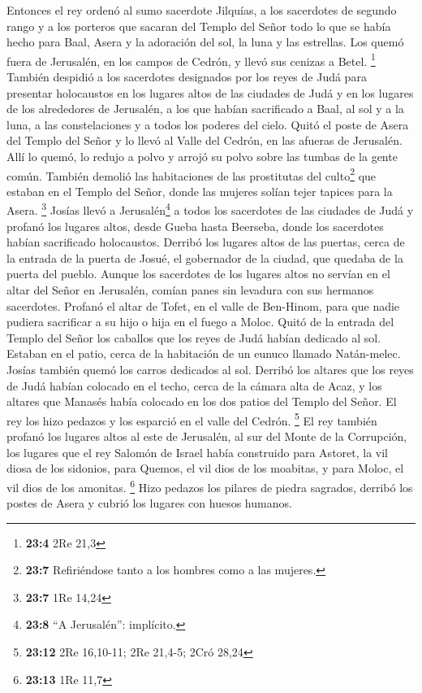  Entonces el rey ordenó al sumo sacerdote Jilquías, a los
sacerdotes de segundo rango y a los porteros que sacaran del Templo del
Señor todo lo que se había hecho para Baal, Asera y la adoración del
sol, la luna y las estrellas. Los quemó fuera de Jerusalén, en los
campos de Cedrón, y llevó sus cenizas a Betel. \footnote{\textbf{23:4}
  2Re 21,3}  También despidió a los sacerdotes designados
por los reyes de Judá para presentar holocaustos en los lugares altos de
las ciudades de Judá y en los lugares de los alrededores de Jerusalén, a
los que habían sacrificado a Baal, al sol y a la luna, a las
constelaciones y a todos los poderes del cielo.  Quitó el
poste de Asera del Templo del Señor y lo llevó al Valle del Cedrón, en
las afueras de Jerusalén. Allí lo quemó, lo redujo a polvo y arrojó su
polvo sobre las tumbas de la gente común.  También demolió
las habitaciones de las prostitutas del culto\footnote{\textbf{23:7}
  Refiriéndose tanto a los hombres como a las mujeres.} que estaban en
el Templo del Señor, donde las mujeres solían tejer tapices para la
Asera. \footnote{\textbf{23:7} 1Re 14,24}  Josías llevó a
Jerusalén\footnote{\textbf{23:8} ``A Jerusalén'': implícito.} a todos
los sacerdotes de las ciudades de Judá y profanó los lugares altos,
desde Gueba hasta Beerseba, donde los sacerdotes habían sacrificado
holocaustos. Derribó los lugares altos de las puertas, cerca de la
entrada de la puerta de Josué, el gobernador de la ciudad, que quedaba
de la puerta del pueblo.  Aunque los sacerdotes de los
lugares altos no servían en el altar del Señor en Jerusalén, comían
panes sin levadura con sus hermanos sacerdotes.  Profanó
el altar de Tofet, en el valle de Ben-Hinom, para que nadie pudiera
sacrificar a su hijo o hija en el fuego a Moloc.  Quitó
de la entrada del Templo del Señor los caballos que los reyes de Judá
habían dedicado al sol. Estaban en el patio, cerca de la habitación de
un eunuco llamado Natán-melec. Josías también quemó los carros dedicados
al sol.  Derribó los altares que los reyes de Judá habían
colocado en el techo, cerca de la cámara alta de Acaz, y los altares que
Manasés había colocado en los dos patios del Templo del Señor. El rey
los hizo pedazos y los esparció en el valle del Cedrón. \footnote{\textbf{23:12}
  2Re 16,10-11; 2Re 21,4-5; 2Cró 28,24}  El rey también
profanó los lugares altos al este de Jerusalén, al sur del Monte de la
Corrupción, los lugares que el rey Salomón de Israel había construido
para Astoret, la vil diosa de los sidonios, para Quemos, el vil dios de
los moabitas, y para Moloc, el vil dios de los amonitas. \footnote{\textbf{23:13}
  1Re 11,7}  Hizo pedazos los pilares de piedra sagrados,
derribó los postes de Asera y cubrió los lugares con huesos humanos.

